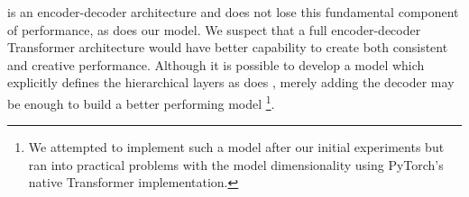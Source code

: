 \vnet{} is an encoder-decoder architecture and does not lose this fundamental component of performance, as does our model. We suspect that a full encoder-decoder Transformer architecture would have better capability to create both consistent and creative performance. Although it is possible to develop a model which explicitly defines the hierarchical layers as does \vnet{}, merely adding the decoder may be enough to build a better performing model%
\footnote{We attempted to implement such a model after our initial experiments but ran into practical problems with the model dimensionality using PyTorch's native Transformer implementation.}. 
